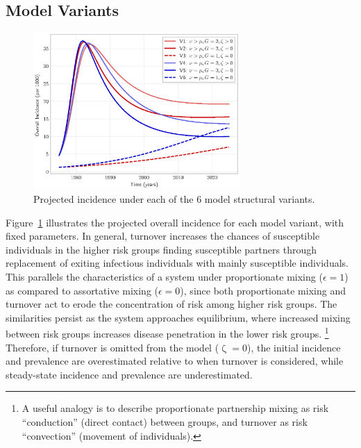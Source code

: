\documentclass[10pt]{article}
\numberwithin{equation}{section}
\renewcommand{\zeta}{\upzeta}
\newcommand{\fig}[1]{Figure~\ref{#1}}
\begin{document}
\subsection{Model Variants}\label{ss:rd-variants}
\begin{figure}
  \centering\includegraphics[width=0.7\textwidth]{incidence-compare.eps}
  \caption{Projected incidence under each of the 6 model structural variants.}
  \label{fig:incidence-compare}
\end{figure}
\fig{fig:incidence-compare} illustrates
the projected overall incidence for each model variant, with fixed parameters.
In general, turnover increases the chances of
susceptible individuals in the higher risk groups finding susceptible partners
through replacement of exiting infectious individuals
with mainly susceptible individuals.
This parallels the characteristics of a system under proportionate mixing ($\epsilon = 1$)
as compared to assortative mixing ($\epsilon = 0$),
since both proportionate mixing and turnover
act to erode the concentration of risk among higher risk groups.
The similarities persist as the system approaches equilibrium,
where increased mixing between risk groups
increases disease penetration in the lower risk groups.%
\footnote{A useful analogy is to describe
  proportionate partnership mixing as risk ``conduction'' (direct contact) between groups,
  and turnover as risk ``convection'' (movement of individuals).}
Therefore, if turnover is omitted from the model ($\zeta = 0$),
the initial incidence and prevalence are overestimated relative to when turnover is considered,
while steady-state incidence and prevalence are underestimated.
\end{document}
